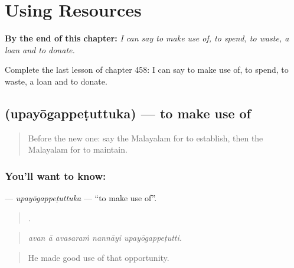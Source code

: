 
\chapter{Using Resources}
\label{ch:ml-using-resources}

\begin{chapteropening}
\textbf{By the end of this chapter:} \emph{I can say to make use of, to spend, to waste, a loan and to donate.}

Complete the last lesson of chapter 458: I can say to make use of, to spend, to waste, a loan and to donate.
\end{chapteropening}

\section[\texorpdfstring{\ml{ഉപയോഗപ്പെടുത്തുക} (upayōgappeṭuttuka)}{ഉപയോഗപ്പെടുത്തുക (upayōgappeṭuttuka)}]{ (upayōgappeṭuttuka) — to make use of}

\label{lesson:ML-C458-upayogappetuttuka}



\begin{quote}
Before the new one: say the Malayalam for to establish, then the Malayalam for to maintain.
\end{quote}

\subsection*{You'll want to know: }
\textbf{} — \emph{upayōgappeṭuttuka} — \textquotedblleft{}to make use of\textquotedblright{}.

\begin{quote}
    .
\end{quote}

\begin{quote}
\emph{avan ā avasaraṁ nannāyi upayōgappeṭutti.}
\end{quote}

\begin{quote}
He made good use of that opportunity.
\end{quote}


